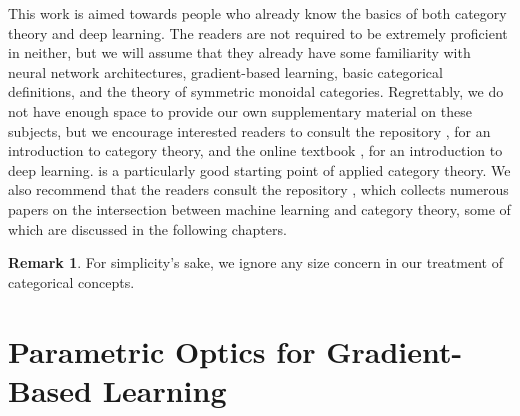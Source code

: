 \documentclass[11pt,a4paper,openright,twoside]{report}
\newcounter{mycounter}
\theoremstyle{plain}
\theoremstyle{definition}
\newtheorem{remark}[mycounter]{Remark}
\begin{document}
This work is aimed towards people who already know the basics of both category theory and deep learning. The readers are not required to be extremely proficient in neither, but we will assume that they already have some familiarity with neural network architectures, gradient-based learning, basic categorical definitions, and the theory of symmetric monoidal categories. Regrettably, we do not have enough space to provide our own supplementary material on these subjects, but we encourage interested readers to consult the repository \cite{gavranovic2023category}, for an introduction to category theory, and the online textbook \cite{zhang2021dive}, for an introduction to deep learning. \cite{fong2018seven} is a particularly good starting point of applied category theory. We also recommend that the readers consult the repository \cite{gavranovic2023intersection}, which collects numerous papers on the intersection between machine learning and category theory, some of which are discussed in the following chapters.

\begin{remark}
  For simplicity's sake, we ignore any size concern in our treatment of categorical concepts.
\end{remark}



\clearpage{\pagestyle{empty}\cleardoublepage}



\tableofcontents
\rhead[\fancyplain{}{\bfseries\leftmark}]{\fancyplain{}{\bfseries\thepage}} 
\clearpage{\pagestyle{empty}\cleardoublepage}



\listoffigures  
\rhead[\fancyplain{}{\bfseries\leftmark}]{\fancyplain{}{\bfseries\thepage}} 
\clearpage{\pagestyle{empty}\cleardoublepage}



\chapter{Parametric Optics for Gradient-Based Learning}
\lhead[\fancyplain{}{\bfseries\thepage}]{\fancyplain{}{\bfseries\rightmark}}
\end{document}
